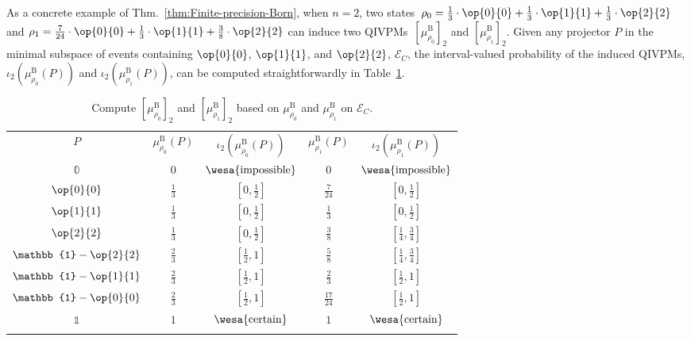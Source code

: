 \documentclass[english,reprint, aps, prl,superscriptaddress, showpacs,
showkeys, longbibliography, amsmath, amssymb, floatfix]{revtex4-1}
\theoremstyle{plain}
\theoremstyle{definition}
\newcommand{\events}{\ensuremath{\mathcal{E}}}
\newcommand{\imposs}{{\text{\wesa{impossible}}}}
\newcommand{\necess}{{\text{\wesa{certain}}}}
\newcommand{\proj}[1]{\op{#1}{#1}}
\begin{document}
As a concrete example of Thm.~\ref{thm:Finite-precision-Born}, when
$n=2$, two states~$\rho_{0}=\frac{1}{3}\cdot\proj{0}+\frac{1}{3}\cdot\proj{1}+\frac{1}{3}\cdot\proj{2}$
and $\rho_{1}=\frac{7}{24}\cdot\proj{0}+\frac{1}{3}\cdot\proj{1}+\frac{3}{8}\cdot\proj{2}$
can induce two QIVPMs~$\left[\mu_{\rho_{0}}^{\mathrm{B}}\right]_{2}$
and $\left[\mu_{\rho_{1}}^{\mathrm{B}}\right]_{2}$. Given any projector
$P$ in the minimal subspace of events containing $\proj{0}$, $\proj{1}$,
and $\proj{2}$, $\events_{C}$, the interval-valued probability of
the induced QIVPMs, $\iota_{2}\left(\mu_{\rho_{0}}^{\mathrm{B}}\left(P\right)\right)$
and $\iota_{2}\left(\mu_{\rho_{1}}^{\mathrm{B}}\left(P\right)\right)$,
can be computed straightforwardly in Table~\ref{tab:Compute-the-QIVPM}.
\begin{table}
\caption{\label{tab:Compute-the-QIVPM}Compute $\left[\mu_{\rho_{0}}^{\mathrm{B}}\right]_{2}$
and $\left[\mu_{\rho_{1}}^{\mathrm{B}}\right]_{2}$ based on $\mu_{\rho_{0}}^{\mathrm{B}}$
and $\mu_{\rho_{1}}^{\mathrm{B}}$ on $\events_{C}$.}

\begin{tabular}{ccccc}
\toprule 
\addlinespace
$P$ & $\mu_{\rho_{0}}^{\mathrm{B}}\left(P\right)$ & $\iota_{2}\left(\mu_{\rho_{0}}^{\mathrm{B}}\left(P\right)\right)$ & $\mu_{\rho_{1}}^{\mathrm{B}}\left(P\right)$ & $\iota_{2}\left(\mu_{\rho_{1}}^{\mathrm{B}}\left(P\right)\right)$\tabularnewline\addlinespace
\midrule
\midrule 
\addlinespace
$\mathbb{0}$ & $0$ & $\imposs$ & $0$ & $\imposs$\tabularnewline\addlinespace
\midrule 
\addlinespace
$\proj{0}$ & $\frac{1}{3}$ & $\left[0,\frac{1}{2}\right]$ & $\frac{7}{24}$ & $\left[0,\frac{1}{2}\right]$\tabularnewline\addlinespace
\midrule 
\addlinespace
$\proj{1}$ & $\frac{1}{3}$ & $\left[0,\frac{1}{2}\right]$ & $\frac{1}{3}$ & $\left[0,\frac{1}{2}\right]$\tabularnewline\addlinespace
\midrule 
\addlinespace
$\proj{2}$ & $\frac{1}{3}$ & $\left[0,\frac{1}{2}\right]$ & $\frac{3}{8}$ & $\left[\tfrac{1}{4},\tfrac{3}{4}\right]$\tabularnewline\addlinespace
\midrule 
\addlinespace
$\mathbb{1}-\proj{2}$ & $\frac{2}{3}$ & $\left[\frac{1}{2},1\right]$ & $\frac{5}{8}$ & $\left[\tfrac{1}{4},\tfrac{3}{4}\right]$\tabularnewline\addlinespace
\midrule 
\addlinespace
$\mathbb{1}-\proj{1}$ & $\frac{2}{3}$ & $\left[\frac{1}{2},1\right]$ & $\frac{2}{3}$ & $\left[\frac{1}{2},1\right]$\tabularnewline\addlinespace
\midrule 
\addlinespace
$\mathbb{1}-\proj{0}$ & $\frac{2}{3}$ & $\left[\frac{1}{2},1\right]$ & $\frac{17}{24}$ & $\left[\frac{1}{2},1\right]$\tabularnewline\addlinespace
\midrule 
\addlinespace
$\mathbb{1}$ & $1$ & $\necess$ & $1$ & $\necess$\tabularnewline\addlinespace
\bottomrule
\end{tabular}
\end{table}
\end{document}
